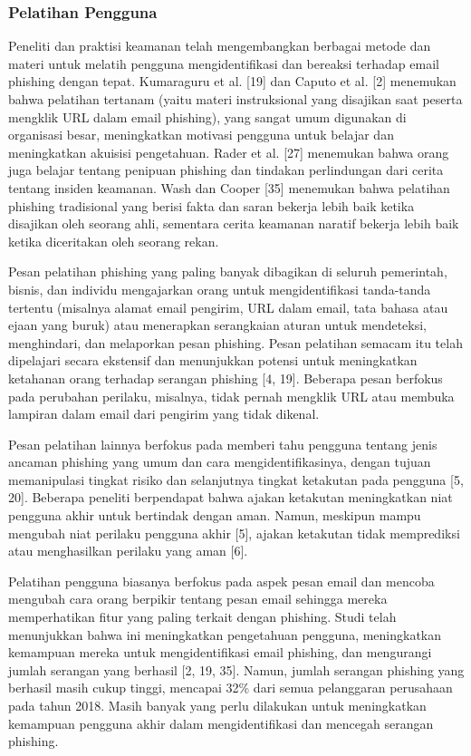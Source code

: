 \documentclass[lettersize,journal]{IEEEtran}
\begin{document}
\subsubsection{Pelatihan Pengguna}
Peneliti dan praktisi keamanan telah mengembangkan berbagai metode dan materi
untuk melatih pengguna mengidentifikasi dan bereaksi terhadap email phishing
dengan tepat. Kumaraguru et al. [19] dan Caputo et al. [2] menemukan bahwa
pelatihan tertanam (yaitu materi instruksional yang disajikan saat peserta
mengklik URL dalam email phishing), yang sangat umum digunakan di organisasi
besar, meningkatkan motivasi pengguna untuk belajar dan meningkatkan akuisisi
pengetahuan. Rader et al. [27] menemukan bahwa orang juga belajar tentang
penipuan phishing dan tindakan perlindungan dari cerita tentang insiden
keamanan. Wash dan Cooper [35] menemukan bahwa pelatihan phishing tradisional
yang berisi fakta dan saran bekerja lebih baik ketika disajikan oleh seorang
ahli, sementara cerita keamanan naratif bekerja lebih baik ketika diceritakan
oleh seorang rekan.

Pesan pelatihan phishing yang paling banyak dibagikan di seluruh pemerintah,
bisnis, dan individu mengajarkan orang untuk mengidentifikasi tanda-tanda
tertentu (misalnya alamat email pengirim, URL dalam email, tata bahasa atau
ejaan yang buruk) atau menerapkan serangkaian aturan untuk mendeteksi,
menghindari, dan melaporkan pesan phishing. Pesan pelatihan semacam itu telah
dipelajari secara ekstensif dan menunjukkan potensi untuk meningkatkan
ketahanan orang terhadap serangan phishing [4, 19]. Beberapa pesan berfokus
pada perubahan perilaku, misalnya, tidak pernah mengklik URL atau membuka
lampiran dalam email dari pengirim yang tidak dikenal.

Pesan pelatihan lainnya berfokus pada memberi tahu pengguna tentang jenis
ancaman phishing yang umum dan cara mengidentifikasinya, dengan tujuan
memanipulasi tingkat risiko dan selanjutnya tingkat ketakutan pada pengguna [5,
    20]. Beberapa peneliti berpendapat bahwa ajakan ketakutan meningkatkan niat
pengguna akhir untuk bertindak dengan aman. Namun, meskipun mampu mengubah niat
perilaku pengguna akhir [5], ajakan ketakutan tidak memprediksi atau
menghasilkan perilaku yang aman [6].

Pelatihan pengguna biasanya berfokus pada aspek pesan email dan mencoba
mengubah cara orang berpikir tentang pesan email sehingga mereka memperhatikan
fitur yang paling terkait dengan phishing. Studi telah menunjukkan bahwa ini
meningkatkan pengetahuan pengguna, meningkatkan kemampuan mereka untuk
mengidentifikasi email phishing, dan mengurangi jumlah serangan yang berhasil
  [2, 19, 35]. Namun, jumlah serangan phishing yang berhasil masih cukup tinggi,
mencapai 32\% dari semua pelanggaran perusahaan pada tahun 2018. Masih banyak
yang perlu dilakukan untuk meningkatkan kemampuan pengguna akhir dalam
mengidentifikasi dan mencegah serangan phishing.
\end{document}
